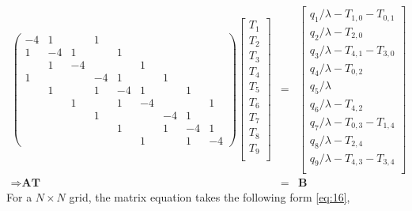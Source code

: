 \documentclass[12pt]{amsart}   %
\begin{document}
\begin{eqnarray}
\begin{pmatrix}
-4 & 1 &  & 1 &&&\\
1 & -4 & 1 &  & 1 &&\\
 & 1 & -4 &  & &1&\\
1 &  &  & -4 & 1&&1\\
 & 1 &  & 1 &-4&1&&1\\
 &  & 1 & &1&-4&&&1\\
 &  &  &1 && &-4&1\\
 &&  &  &1 && 1&-4&1 \\
 &&&  &  &1 && 1&-4
\end{pmatrix} \begin{bmatrix}
T_{1}\\
T_{2}\\
T_{3}\\
T_{4}\\
T_{5}\\
T_{6}\\
T_{7}\\
T_{8}\\
T_{9}\\
\end{bmatrix} &=&
\begin{bmatrix}
{q_{1}}/{\lambda}-T_{1,0}-T_{0,1}\\
{q_{2}}/{\lambda}-T_{2,0}\\
{q_{3}}/{\lambda}-T_{4,1}-T_{3,0}\\
{q_{4}}/{\lambda}-T_{0,2}\\
{q_{5}}/{\lambda}\\
{q_{6}}/{\lambda}-T_{4,2}\\
{q_{7}}/{\lambda}-T_{0,3}-T_{1,4}\\
{q_{8}}/{\lambda}-T_{2,4}\\
{q_{9}}/{\lambda}-T_{4,3}-T_{3,4}\\
\end{bmatrix} \nonumber \\
\Rightarrow \textbf{AT}&=&\textbf{B}
\end{eqnarray}
For a $N\times N$ grid, the matrix equation takes the following form \ref{eq:16},
\end{document}
